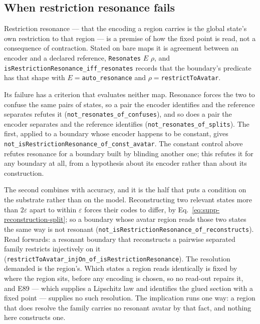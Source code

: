\documentclass{article}
\begin{document}
\subsection{When restriction resonance fails}
\label{sec:supp-resonance-failure}

Restriction resonance --- that the encoding a region carries is the global
state's own restriction to that region --- is a premise of how the fixed point
is read, not a consequence of contraction. Stated on bare maps it is agreement
between an encoder and a declared reference, \texttt{Resonates} $E$ $\rho$, and
\nolinkurl{isRestrictionResonance_iff_resonates} records that the boundary's
predicate has that shape with $E=$\nolinkurl{auto_resonance} and
$\rho=$\texttt{restrictToAvatar}.

Its failure has a criterion that evaluates neither map. Resonance forces the two
to confuse the same pairs of states, so a pair the encoder identifies and the
reference separates refutes it (\nolinkurl{not_resonates_of_confuses}), and so does
a pair the encoder separates and the reference identifies
(\nolinkurl{not_resonates_of_splits}). The first, applied to a boundary whose
encoder happens to be constant, gives
\nolinkurl{not_isRestrictionResonance_of_const_avatar}. The constant control
above refutes resonance for a boundary built by blinding another one; this
refutes it for any boundary at all, from a hypothesis about its encoder rather
than about its construction.

The second combines with accuracy, and it is the half that puts a condition on
the substrate rather than on the model.
Reconstructing two relevant states more than $2\varepsilon$ apart to within
$\varepsilon$ forces their codes to differ, by
Eq.~\eqref{eq:supp-reconstruction-split}; so a boundary whose avatar region
reads those two states the same way is not resonant
(\nolinkurl{not_isRestrictionResonance_of_reconstructs}). Read forwards: a resonant
boundary that reconstructs a pairwise separated family restricts injectively on
it (\nolinkurl{restrictToAvatar_injOn_of_isRestrictionResonance}). The resolution
demanded is the region's. Which states a region reads identically is fixed by
where the region sits, before any encoding is chosen, so no read-out repairs it,
and E89 --- which supplies a Lipschitz law and identifies the glued section with
a fixed point --- supplies no such resolution. The implication runs one way: a
region that does resolve the family carries no resonant avatar by that fact, and
nothing here constructs one.
\end{document}
